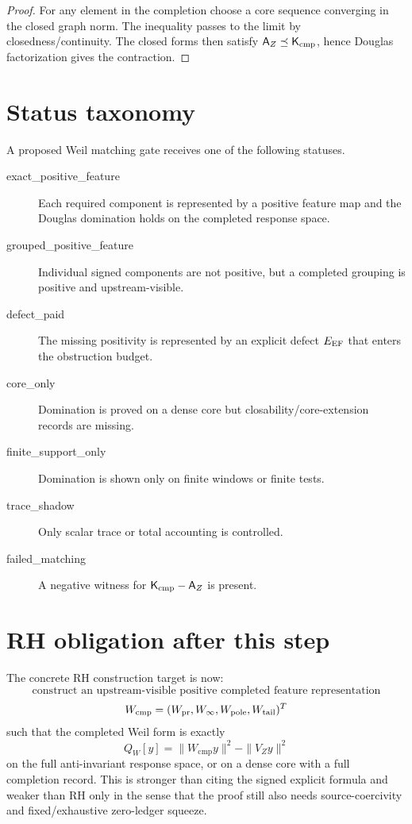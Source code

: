 \documentclass[11pt]{article}
\newcommand{\K}{\mathsf K}
\newcommand{\A}{\mathsf A}
\newcommand{\Wcmp}{W_{\mathrm{cmp}}}
\newcommand{\VZ}{V_Z}
\begin{document}
\begin{proof}
For any element in the completion choose a core sequence converging in the closed graph norm. The inequality passes to the limit by closedness/continuity. The closed forms then satisfy \(\A_Z\preceq\K_{\rm cmp}\), hence Douglas factorization gives the contraction.\qedhere
\end{proof}

\section{Status taxonomy}

A proposed Weil matching gate receives one of the following statuses.
\begin{description}
\item[exact\_positive\_feature] Each required component is represented by a positive feature map and the Douglas domination holds on the completed response space.
\item[grouped\_positive\_feature] Individual signed components are not positive, but a completed grouping is positive and upstream-visible.
\item[defect\_paid] The missing positivity is represented by an explicit defect \(E_{\rm EF}\) that enters the obstruction budget.
\item[core\_only] Domination is proved on a dense core but closability/core-extension records are missing.
\item[finite\_support\_only] Domination is shown only on finite windows or finite tests.
\item[trace\_shadow] Only scalar trace or total accounting is controlled.
\item[failed\_matching] A negative witness for \(\K_{\rm cmp}-\A_Z\) is present.
\end{description}

\section{RH obligation after this step}
The concrete RH construction target is now:
\[
  \boxed{
  \text{construct an upstream-visible positive completed feature representation}
  }
\]
\[
  \Wcmp=(W_{\rm pr},W_{\infty},W_{\rm pole},W_{\rm tail})^T
\]
such that the completed Weil form is exactly
\[
  Q_W[y]=\|\Wcmp y\|^2-\|\VZ y\|^2
\]
on the full anti-invariant response space, or on a dense core with a full completion record. This is stronger than citing the signed explicit formula and weaker than RH only in the sense that the proof still also needs source-coercivity and fixed/exhaustive zero-ledger squeeze.
\end{document}
